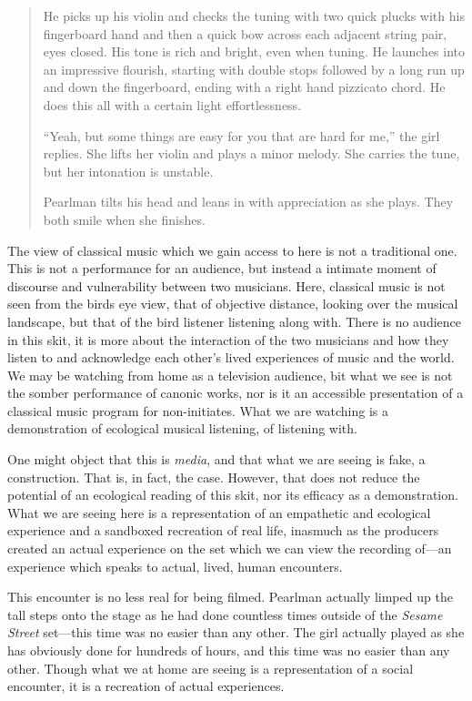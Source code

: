 \documentclass[12pt,letterpaper]{article}
\begin{document}
\begin{quote}
	He picks up his violin and checks the tuning with two quick plucks with 
	his fingerboard hand and then a quick bow across each adjacent string
	pair, eyes closed. His tone is rich and bright, even when tuning. He 
	launches into an impressive flourish, starting with double stops 
	followed by a long run up and down the fingerboard, ending with a right
	hand pizzicato chord. He does this all with a certain light 
	effortlessness.

	``Yeah, but some things are easy for you that are hard for me,'' the 
	girl replies. She lifts her violin and plays a minor melody. She 
	carries the tune, but her intonation is unstable. 

	Pearlman tilts his head and leans in with appreciation as she plays.
	They both smile when she finishes.   

	\end{quote}

	The view of classical music which we gain access to here is not a
	traditional one. This is not a performance for an audience, but instead
	a intimate moment of discourse and vulnerability between two 
	musicians. Here, classical music is not seen from the birds eye view,
	that of 
	objective distance, looking over the musical landscape, but that of the 
	bird listener listening along with. There is no audience in this skit, 
	it is
	more about the interaction of the two musicians and how they listen to 
	and acknowledge each other's lived experiences of music and the world. 
	We may be watching from home as a television audience, bit what we see
	is not the somber performance of canonic works, nor is it an accessible
	presentation of a classical music program for non-initiates. What we 
	are watching is a demonstration of ecological musical listening, of 
	listening with. 

	One might object that this is \textit{media}, and that what we are
	seeing is fake, a construction. That is, in fact, the case. However, 
	that does not reduce the potential of an ecological reading of this 
	skit, nor its efficacy as a demonstration. What we are seeing here is a 
	representation of an empathetic and ecological experience and a 
	sandboxed recreation of real life, inasmuch as the producers created an
	actual experience on the set which we can view the recording of---an 
	experience which speaks to actual, lived, human encounters. 
	
	This encounter is no less real for being filmed. Pearlman actually 
	limped up the tall steps onto the stage as he had done countless times 
	outside of the \textit{Sesame Street} set---this time was no easier than
	any other. The girl actually played as she has obviously done for
	hundreds of hours, and this time was no easier than any other. 
	Though what we at home are seeing is a representation of a social 
	encounter, it is a recreation of actual	experiences. 
\end{document}

